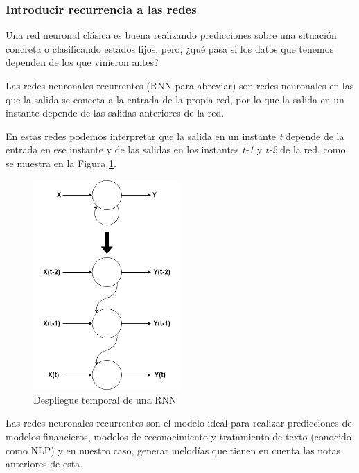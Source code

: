     \subsubsection{Introducir recurrencia a las redes}
    \label{subsub:introRedesNeuronalesRecurrentes}
    Una red neuronal clásica es buena realizando predicciones sobre una situación concreta o clasificando estados fijos, pero, ¿qué pasa si los datos que tenemos dependen de los que vinieron antes?

    Las redes neuronales recurrentes (RNN para abreviar) son redes neuronales en las que la salida se conecta a la entrada de la propia red, por lo que la salida en un instante depende de las salidas anteriores de la red.

    En estas redes podemos interpretar que la salida en un instante \textit{t} depende de la entrada en ese instante y de las salidas en los instantes \textit{t-1} y \textit{t-2} de la red, como se muestra en la Figura \ref{fig:simpleRNN}.

    \begin{figure}[h]
        \centering
        \includegraphics[width=0.5\textwidth]{Imagenes/Bitmap/RNN.png}
        \caption{Despliegue temporal de una RNN}
        \label{fig:simpleRNN}
    \end{figure}

    Las redes neuronales recurrentes son el modelo ideal para realizar predicciones de modelos financieros, modelos de reconocimiento y tratamiento de texto (conocido como NLP) y en nuestro caso, generar melodías que tienen en cuenta las notas anteriores de esta.

